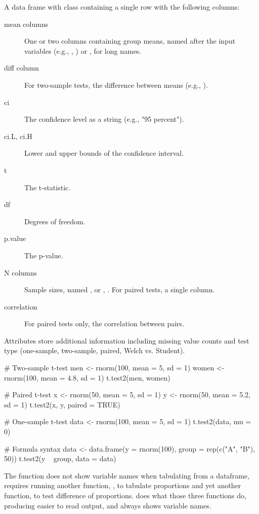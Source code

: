 \documentclass[a4paper]{book}
\begin{document}
\begin{Value}
A data frame with class  containing 
a single row with the following columns:
\begin{description}

\item[mean columns] One or two columns containing group means, named after 
the input variables (e.g., , ) or , 
 for long names.
\item[diff column] For two-sample tests, the difference between means 
(e.g., ).
\item[ci] The confidence level as a string (e.g., "95 percent").
\item[ci.L, ci.H] Lower and upper bounds of the confidence interval.
\item[t] The t-statistic.
\item[df] Degrees of freedom.
\item[p.value] The p-value.
\item[N columns] Sample sizes, named ,  or 
, . For paired tests, a single  column.
\item[correlation] For paired tests only, the correlation between pairs.

\end{description}

Attributes store additional information including missing value counts and 
test type (one-sample, two-sample, paired, Welch vs. Student).
\end{Value}
%
\begin{Examples}
\begin{ExampleCode}
# Two-sample t-test
men <- rnorm(100, mean = 5, sd = 1)
women <- rnorm(100, mean = 4.8, sd = 1)
t.test2(men, women)

# Paired t-test
x <- rnorm(50, mean = 5, sd = 1)
y <- rnorm(50, mean = 5.2, sd = 1)
t.test2(x, y, paired = TRUE)

# One-sample t-test
data <- rnorm(100, mean = 5, sd = 1)
t.test2(data, mu = 0)

# Formula syntax
data <- data.frame(y = rnorm(100), group = rep(c("A", "B"), 50))
t.test2(y ~ group, data = data)

\end{ExampleCode}
\end{Examples}
%
\begin{Description}
The function  does not show variable 
names when tabulating from a dataframe, requires running another
function, ,  to tabulate proportions 
and yet another function,  to test difference of 
proportions.   does what those three functions do, producing easier to 
read output, and always shows variable names.
\end{Description}
\end{document}
